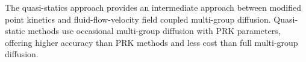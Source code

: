 The quasi-statics approach provides an intermediate approach between modified point kinetics and fluid-flow-velocity field coupled multi-group diffusion.
Quasi-static methods use occasional multi-group diffusion with \gls{PRK} parameters, offering higher accuracy than \gls{PRK} methods and less cost than full multi-group diffusion.





